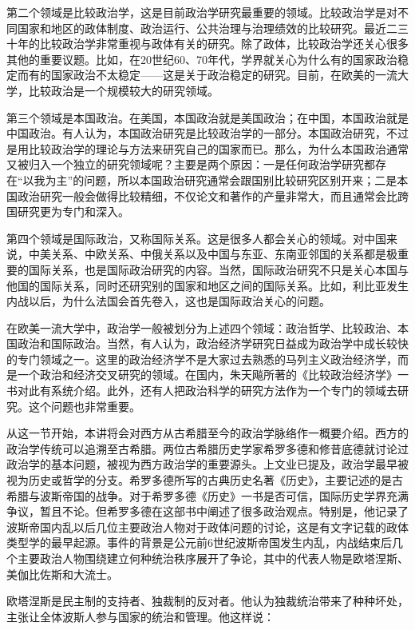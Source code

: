 第二个领域是比较政治学，这是目前政治学研究最重要的领域。比较政治学是对不同国家和地区的政体制度、政治运行、公共治理与治理绩效的比较研究。最近二三十年的比较政治学非常重视与政体有关的研究。除了政体，比较政治学还关心很多其他的重要议题。比如，在20世纪60、70年代，学界就关心为什么有的国家政治稳定而有的国家政治不太稳定——这是关于政治稳定的研究。目前，在欧美的一流大学，比较政治是一个规模较大的研究领域。

第三个领域是本国政治。在美国，本国政治就是美国政治；在中国，本国政治就是中国政治。有人认为，本国政治研究是比较政治学的一部分。本国政治研究，不过是用比较政治学的理论与方法来研究自己的国家而已。那么，为什么本国政治通常又被归入一个独立的研究领域呢？主要是两个原因：一是任何政治学研究都存在“以我为主”的问题，所以本国政治研究通常会跟国别比较研究区别开来；二是本国政治研究一般会做得比较精细，不仅论文和著作的产量非常大，而且通常会比跨国研究更为专门和深入。

第四个领域是国际政治，又称国际关系。这是很多人都会关心的领域。对中国来说，中美关系、中欧关系、中俄关系以及中国与东亚、东南亚邻国的关系都是极重要的国际关系，也是国际政治研究的内容。当然，国际政治研究不只是关心本国与他国的国际关系，同时还研究别的国家和地区之间的国际关系。比如，利比亚发生内战以后，为什么法国会首先卷入，这也是国际政治关心的问题。

在欧美一流大学中，政治学一般被划分为上述四个领域：政治哲学、比较政治、本国政治和国际政治。当然，有人认为，政治经济学研究日益成为政治学中成长较快的专门领域之一。这里的政治经济学不是大家过去熟悉的马列主义政治经济学，而是一个政治和经济交叉研究的领域。在国内，朱天飚所著的《比较政治经济学》一书对此有系统介绍。此外，还有人把政治科学的研究方法作为一个专门的领域去研究。这个问题也非常重要。


从这一节开始，本讲将会对西方从古希腊至今的政治学脉络作一概要介绍。西方的政治学传统可以追溯至古希腊。两位古希腊历史学家希罗多德和修昔底德就讨论过政治学的基本问题，被视为西方政治学的重要源头。上文业已提及，政治学最早被视为历史或哲学的分支。希罗多德所写的古典历史名著《历史》，主要记述的是古希腊与波斯帝国的战争。对于希罗多德《历史》一书是否可信，国际历史学界充满争议，暂且不论。但希罗多德在这部书中阐述了很多政治观点。特别是，他记录了波斯帝国内乱以后几位主要政治人物对于政体问题的讨论，这是有文字记载的政体类型学的最早起源。事件的背景是公元前6世纪波斯帝国发生内乱，内战结束后几个主要政治人物围绕建立何种统治秩序展开了争论，其中的代表人物是欧塔涅斯、美伽比佐斯和大流士。

欧塔涅斯是民主制的支持者、独裁制的反对者。他认为独裁统治带来了种种坏处，主张让全体波斯人参与国家的统治和管理。他这样说：

